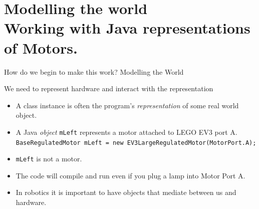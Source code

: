 \documentclass[color=pdftex,usenames,dvipsnames, aspectratio=169]{beamer}
\begin{document}
\section{Modelling the world\\ Working with Java representations of Motors.}

\begin{frame}[fragile]{How do we begin to make this work? Modelling the World}
\begin{block}{We need to represent hardware and interact with the representation}
\begin{itemize}
\item A class \alert{instance} is often the program's \emph{representation} of some real world object.
\item A Java \emph{object} \lstinline!mLeft! represents a motor attached to LEGO EV3 port A.\\
\lstinline[basicstyle=\ttfamily\small\color{blue}]!BaseRegulatedMotor mLeft = new EV3LargeRegulatedMotor(MotorPort.A);!
\item \lstinline!mLeft! is not a motor.
\item \alert{The code will compile and run even if you  plug a lamp into Motor Port A.}
\item \textcolor{OliveGreen}{In robotics it is important to have objects that mediate between us and hardware.}
\end{itemize}
\end{block}
\end{frame}
\end{document}
